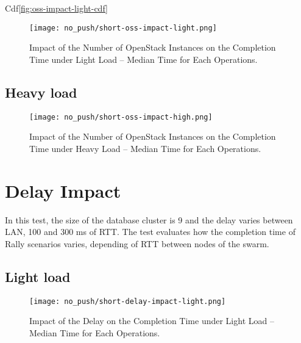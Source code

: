 Cdf\ref{fig:oss-impact-light-cdf}


\begin{figure}[H]
  \vspace{-10pt}
  \centering
  \centerline{\texttt{[image: no\_push/short-oss-impact-light.png]}}
  \vspace{-5pt}
  \caption{Impact of the Number of OpenStack Instances on the Completion Time under Light Load – Median Time for Each Operations.}
  \vspace{-5pt}
  \label{fig:short-oss-impact-light}
\end{figure}

\subsection{Heavy load}

\begin{figure}[H]
  \vspace{-10pt}
  \centering
  \centerline{\texttt{[image: no\_push/short-oss-impact-high.png]}}
  \vspace{-5pt}
  \caption{Impact of the Number of OpenStack Instances on the Completion Time under Heavy Load – Median Time for Each Operations.}
  \vspace{-5pt}
  \label{fig:short-oss-impact-high}
\end{figure}


\section{Delay Impact}

In this test, the size of the database cluster is 9 and the delay varies between LAN, 100 and 300 ms of RTT. The test evaluates how the completion time of Rally scenarios varies, depending of RTT between nodes of the swarm.



\subsection{Light load}

\begin{figure}[H]
  \vspace{-10pt}
  \centering
  \centerline{\texttt{[image: no\_push/short-delay-impact-light.png]}}
  \vspace{-5pt}
  \caption{Impact of the Delay on the Completion Time under Light Load – Median Time for Each Operations.}
  \vspace{-5pt}
  \label{fig:short-delay-impact-light}
\end{figure}

